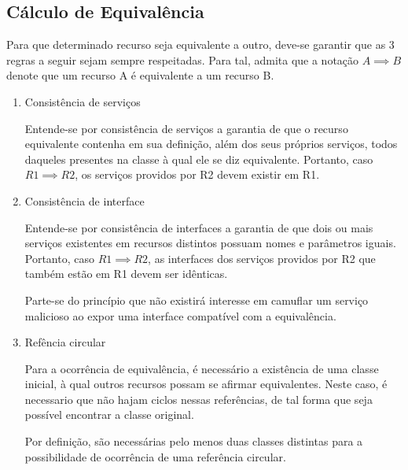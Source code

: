 \subsection{Cálculo de Equivalência}

Para que determinado recurso seja equivalente a outro, deve-se garantir que as 3 regras a seguir sejam sempre respeitadas. Para tal, admita que a notação $A \implies B$ denote que um recurso A é equivalente a um recurso B.

\begin{enumerate}
	\item Consistência de serviços

		Entende-se por consistência de serviços a garantia de que o recurso equivalente contenha em sua definição, além dos seus próprios serviços, todos daqueles presentes na classe à qual ele se diz equivalente. Portanto, caso $R1 \implies R2$, os serviços providos por R2 devem existir em R1.

	\item Consistência de interface

		Entende-se por consistência de interfaces a garantia de que dois ou mais serviços existentes em recursos distintos possuam nomes e parâmetros iguais. Portanto, caso $R1 \implies R2$, as interfaces dos serviços providos por R2 que também estão em R1 devem ser idênticas.

		Parte-se do princípio que não existirá interesse em camuflar um serviço malicioso ao expor uma interface compatível com a equivalência.

	\item Refência circular

		Para a ocorrência de equivalência, é necessário a existência de uma classe inicial, à qual outros recursos possam se afirmar equivalentes. Neste caso, é necessario que não hajam ciclos nessas referências, de tal forma que seja possível encontrar a classe original.

		Por definição, são necessárias pelo menos duas classes distintas para a possibilidade de ocorrência de uma referência circular.
\end{enumerate}

